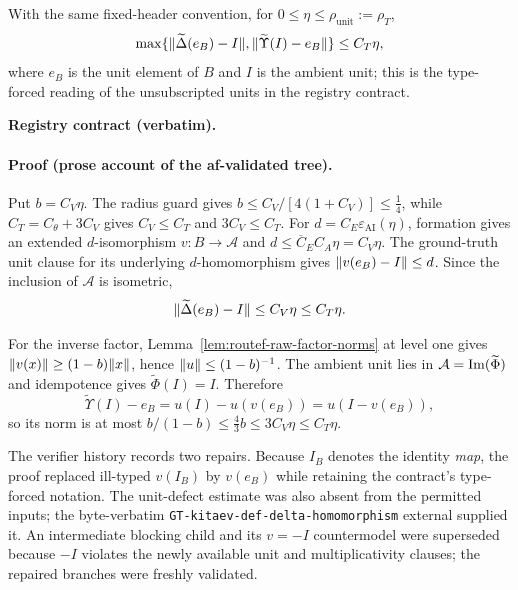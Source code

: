\begin{lemma}\label{lem:routef-raw-factor-units}
With the same fixed-header convention, for
$0\le\eta\le\rho_{\mathrm{unit}}:=\rho_T$,
\[
 \max\{\lVert \widetilde\Delta(e_B)-I\rVert,
          \lVert \widetilde\Upsilon(I)-e_B\rVert\}\le C_T\eta,
\]
where $e_B$ is the unit element of $B$ and $I$ is the ambient unit; this is the
type-forced reading of the unsubscripted units in the registry contract.
\end{lemma}
\noindent\textbf{Registry contract (verbatim).}

\paragraph{Proof (prose account of the af-validated tree).}
Put $b=C_V\eta$.  The radius guard gives $b\le C_V/[4(1+C_V)]\le\tfrac14$, while
$C_T=C_\theta+3C_V$ gives $C_V\le C_T$ and $3C_V\le C_T$.
For $d=C_E\varepsilon_{\mathrm{AI}}(\eta)$, formation gives an extended $d$-isomorphism
$v:B\to\mathcal A$ and $d\le\overline C_EC_A\eta=C_V\eta$.  The ground-truth unit
clause for its underlying $d$-homomorphism gives $\lVert v(e_B)-I\rVert\le d$.  Since the
inclusion of $\mathcal A$ is isometric,
\[
 \lVert \widetilde\Delta(e_B)-I\rVert\le C_V\eta\le C_T\eta.
\]

For the inverse factor, Lemma~\ref{lem:routef-raw-factor-norms} at level one gives
$\lVert v(x)\rVert\ge(1-b)\lVert x\rVert$, hence $\lVert u\rVert\le(1-b)^{-1}$.  The ambient unit lies in
$\mathcal A=\operatorname{Im}(\widetilde\Phi)$ and idempotence gives
$\widetilde\Phi(I)=I$.  Therefore
\[
 \widetilde\Upsilon(I)-e_B=u(I)-u(v(e_B))=u(I-v(e_B)),
\]
so its norm is at most $b/(1-b)\le\tfrac43b\le3C_V\eta\le C_T\eta$.

The verifier history records two repairs.  Because $I_B$ denotes the identity \emph{map},
the proof replaced ill-typed $v(I_B)$ by $v(e_B)$ while retaining the contract's
type-forced notation.  The unit-defect estimate was also absent from the permitted inputs;
the byte-verbatim \texttt{GT-kitaev-def-delta-homomorphism} external supplied it.
An intermediate blocking child and its $v=-I$ countermodel were superseded because $-I$
violates the newly available unit and multiplicativity clauses; the repaired branches
were freshly validated.
